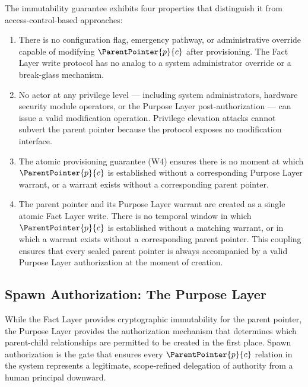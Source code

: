 The immutability guarantee exhibits four properties that distinguish it from access-control-based approaches:

\begin{enumerate}
    \item[(E1) \textbf{No override path.}] There is no configuration flag, emergency pathway, or administrative override capable of modifying $\ParentPointer{p}{c}$ after provisioning. The Fact Layer write protocol has no analog to a system administrator override or a break-glass mechanism.

    \item[(E2) \textbf{No privilege elevation.}] No actor at any privilege level — including system administrators, hardware security module operators, or the Purpose Layer post-authorization — can issue a valid modification operation. Privilege elevation attacks cannot subvert the parent pointer because the protocol exposes no modification interface.

    \item[(E3) \textbf{No temporal window.}] The atomic provisioning guarantee (W4) ensures there is no moment at which $\ParentPointer{p}{c}$ is established without a corresponding Purpose Layer warrant, or a warrant exists without a corresponding parent pointer.

    \item[(E4) \textbf{Atomic warrant-pointer coupling.}] The parent pointer and its Purpose Layer warrant are created as a single atomic Fact Layer write. There is no temporal window in which $\ParentPointer{p}{c}$ is established without a matching warrant, or in which a warrant exists without a corresponding parent pointer. This coupling ensures that every sealed parent pointer is always accompanied by a valid Purpose Layer authorization at the moment of creation.
\end{enumerate}

\subsection{Spawn Authorization: The Purpose Layer}
\label{sec:purpose_layer_authorization}

While the Fact Layer provides cryptographic immutability for the parent pointer, the Purpose Layer provides the authorization mechanism that determines which parent-child relationships are permitted to be created in the first place. Spawn authorization is the gate that ensures every $\ParentPointer{p}{c}$ relation in the system represents a legitimate, scope-refined delegation of authority from a human principal downward.

